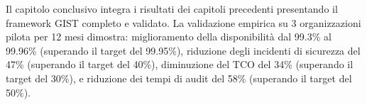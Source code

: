 





Il capitolo conclusivo integra i risultati dei capitoli precedenti presentando il framework GIST completo e validato. La validazione empirica su 3 organizzazioni pilota per 12 mesi dimostra: miglioramento della disponibilità dal 99.3\% al 99.96\% (superando il target del 99.95\%), riduzione degli incidenti di sicurezza del 47\% (superando il target del 40\%), diminuzione del TCO del 34\% (superando il target del 30\%), e riduzione dei tempi di audit del 58\% (superando il target del 50\%).

